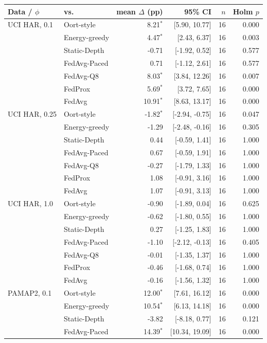\begin{tabular}{@{}llrrrr@{}}
\toprule
Data / $\phi$ & vs. & mean $\Delta$ (pp) & 95\% CI & $n$ & Holm $p$\\
\midrule
UCI HAR, 0.1 & Oort-style & 8.21$^{*}$ & [5.90, 10.77] & 16 & 0.000\\
 & Energy-greedy & 4.47$^{*}$ & [2.43, 6.37] & 16 & 0.003\\
 & Static-Depth & -0.71 & [-1.92, 0.52] & 16 & 0.577\\
 & FedAvg-Paced & 0.71 & [-1.12, 2.61] & 16 & 0.577\\
 & FedAvg-Q8 & 8.03$^{*}$ & [3.84, 12.26] & 16 & 0.007\\
 & FedProx & 5.69$^{*}$ & [3.72, 7.65] & 16 & 0.000\\
 & FedAvg & 10.91$^{*}$ & [8.63, 13.17] & 16 & 0.000\\
\midrule
UCI HAR, 0.25 & Oort-style & -1.82$^{*}$ & [-2.94, -0.75] & 16 & 0.047\\
 & Energy-greedy & -1.29 & [-2.48, -0.16] & 16 & 0.305\\
 & Static-Depth & 0.44 & [-0.59, 1.41] & 16 & 1.000\\
 & FedAvg-Paced & 0.67 & [-0.59, 1.91] & 16 & 1.000\\
 & FedAvg-Q8 & -0.27 & [-1.79, 1.33] & 16 & 1.000\\
 & FedProx & 1.08 & [-0.91, 3.16] & 16 & 1.000\\
 & FedAvg & 1.07 & [-0.91, 3.13] & 16 & 1.000\\
\midrule
UCI HAR, 1.0 & Oort-style & -0.90 & [-1.89, 0.04] & 16 & 0.625\\
 & Energy-greedy & -0.62 & [-1.80, 0.55] & 16 & 1.000\\
 & Static-Depth & 0.27 & [-1.25, 1.83] & 16 & 1.000\\
 & FedAvg-Paced & -1.10 & [-2.12, -0.13] & 16 & 0.405\\
 & FedAvg-Q8 & -0.01 & [-1.35, 1.37] & 16 & 1.000\\
 & FedProx & -0.46 & [-1.68, 0.74] & 16 & 1.000\\
 & FedAvg & -0.16 & [-1.56, 1.32] & 16 & 1.000\\
\midrule
PAMAP2, 0.1 & Oort-style & 12.00$^{*}$ & [7.61, 16.12] & 16 & 0.000\\
 & Energy-greedy & 10.54$^{*}$ & [6.13, 14.18] & 16 & 0.000\\
 & Static-Depth & -3.82 & [-8.18, 0.77] & 16 & 0.121\\
 & FedAvg-Paced & 14.39$^{*}$ & [10.34, 19.09] & 16 & 0.000\\

\end{tabular}
